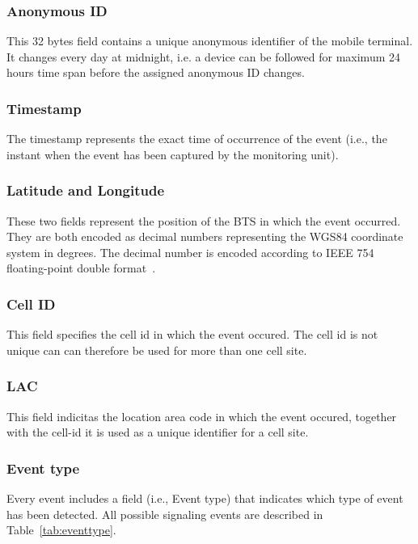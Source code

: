 \documentclass[master,english]{hgbthesis}
\begin{document}
\subsubsection{Anonymous ID}
\label{sec:anonymous}
This 32 bytes field contains a unique anonymous identifier of the mobile terminal. It changes every day at midnight, i.e. a device can be followed for maximum 24 hours time span before the assigned anonymous ID changes.
\subsubsection{Timestamp} The timestamp represents the exact time of occurrence of the event (i.e., the instant when the event has been captured by the monitoring unit).
\subsubsection{Latitude and Longitude}
These two fields represent the position of the BTS in which the event occurred. They are both encoded as decimal numbers representing the WGS84 coordinate system in degrees. The decimal number is encoded according to IEEE 754 floating-point double format~\cite{IEEE754}.
\subsubsection{Cell ID}
This field specifies the cell id in which the event occured. The cell id is not unique can can therefore be used for more than one cell site.
\subsubsection{LAC}
This field indicitas the location area code in which the event occured, together with the cell-id it is used as a unique identifier for a cell site.
\subsubsection{Event type}
Every event includes a field (i.e., Event type) that indicates which type of event has been detected. All possible signaling events are described in Table~\ref{tab:eventtype}.
\end{document}
